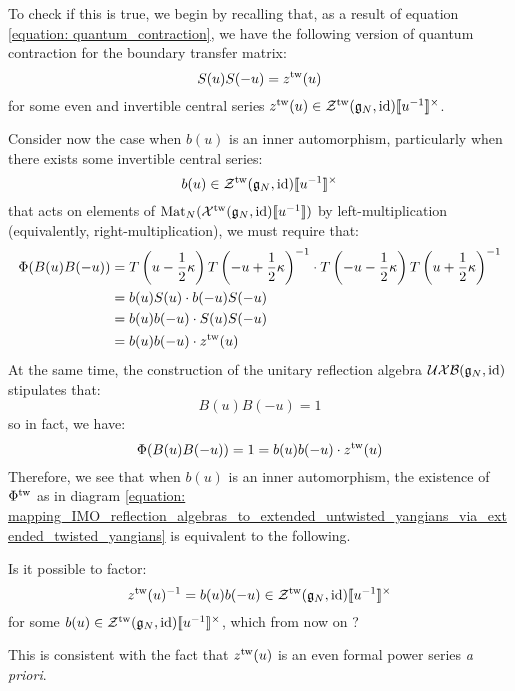             To check if this is true, we begin by recalling that, as a result of equation \eqref{equation: quantum_contraction}, we have the following version of quantum contraction for the boundary transfer matrix:
                $$S(u) S(-u) = z^{\mathrm{tw}}(u)$$
            for some even and invertible central series $z^{\tw}(u) \in \calZ^{\tw}(\g_N, \id)[\![u^{-1}]\!]^{\x}$.
            
            Consider now the case when $b(u)$ is an inner automorphism, particularly when there exists some invertible central series:
                $$b(u) \in \calZ^{\tw}(\g_N, \id)[\![u^{-1}]\!]^{\x}$$
            that acts on elements of $\mathrm{Mat}_N(\mathcal{X}^{\mathrm{tw}}(\mathfrak{g}_N, \mathrm{id})[\![u^{-1}]\!])$ by left-multiplication (equivalently, right-multiplication), we must require that:
                $$
                    \begin{aligned}
                        \Phi( B(u) B(-u) ) & = T\left(u - \frac12 \kappa\right) T\left(-u + \frac12 \kappa\right)^{-1} \cdot T\left(-u - \frac12 \kappa\right) T\left(u + \frac12 \kappa\right)^{-1}
                        \\
                        & = b(u) S(u) \cdot b(-u) S(-u)
                        \\
                        & = b(u) b(-u) \cdot S(u) S(-u)
                        \\
                        & = b(u) b(-u) \cdot z^{\mathrm{tw}}(u)
                    \end{aligned}
                $$
            At the same time, the construction of the unitary reflection algebra $\mathcal{UXB}(\mathfrak{g}_N, \mathrm{id})$ stipulates that:
                $$B(u) B(-u) = 1$$
            so in fact, we have:
                $$\Phi( B(u) B(-u) ) = 1 = b(u) b(-u) \cdot z^{\mathrm{tw}}(u)$$
            Therefore, we see that when $b(u)$ is an inner automorphism, the existence of $\Phi^{\mathrm{tw}}$ as in diagram \eqref{equation: mapping_IMO_reflection_algebras_to_extended_untwisted_yangians_via_extended_twisted_yangians} is equivalent to the following.
            \begin{question} \label{question: square_roots_of_quantum_contractions}
                Is it possible to factor:
                    \begin{equation} \label{equation: square_roots_of_quantum_contractions}
                        z^{\tw}(u)^{-1} = b(u) b(-u) \in \calZ^{\tw}(\g_N, \id)[\![u^{-1}]\!]^{\x}
                    \end{equation}
                for some $b(u) \in \calZ^{\tw}(\g_N, \id)[\![u^{-1}]\!]^{\x}$, which from now on  ?
            \end{question}
            \begin{remark}
                This is consistent with the fact that $z^{\mathrm{tw}}(u)$ is an even formal power series \textit{a priori}.
            \end{remark}


